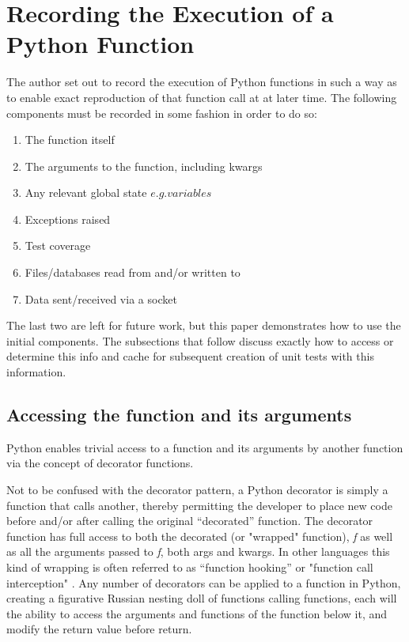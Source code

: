 \section{Recording the Execution of a Python Function}\label{sec:approach}
The author set out to record the execution of Python functions
in such a way as to enable exact reproduction of that 
function call at at later time.  The following components
must be recorded in some fashion in order to do so:
\begin{enumerate}
  \item The function itself
  \item The arguments to the function, including kwargs
  \item Any relevant global state \(e.g. variables\)
  \item Exceptions raised
  \item Test coverage
  \item Files/databases read from and/or written to
  \item Data sent/received via a socket
\end{enumerate}

The last two are left for future work, but this paper demonstrates how to use 
the initial components. The subsections that follow discuss exactly how to 
access or determine this info and cache for subsequent creation of unit tests
with this information.
\subsection{Accessing the function and its arguments}\label{sec:approach-internal-1}

Python enables trivial access to a function and 
its arguments by another function via the concept of 
decorator functions.

Not to be confused with the decorator pattern, a Python decorator is simply a 
function that calls another, thereby permitting the developer to place new code 
before and/or after calling the original “decorated” function.  
The decorator function has full access to both the decorated 
(or "wrapped" function), \textit{f} as well as all the 
arguments passed to \textit{f}, both args and kwargs.  In other 
languages this kind of wrapping is often referred to as 
“function hooking” or "function call interception" 
 \cite{kang2018function}. Any number of decorators can be applied to a function 
in Python, creating a figurative Russian nesting doll of
functions calling functions, each will the ability to access the 
arguments and functions of the function below it, and modify the 
return value before return.

